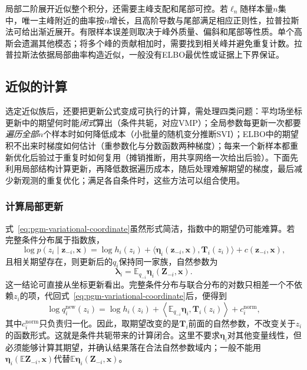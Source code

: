 局部二阶展开近似整个积分，还需要主峰支配和尾部可控。若$\ell_n$随样本量$n$集中，唯一主峰附近的曲率按$n$增长，且高阶导数与尾部满足相应正则性，拉普拉斯法可给出渐近展开。有限样本误差则取决于峰外质量、偏斜和尾部等性质。单个高斯会遗漏其他模态；将多个峰的贡献相加时，需要找到相关峰并避免重复计数。拉普拉斯法依据局部曲率构造近似，一般没有ELBO最优性或证据上下界保证。

\subsection{近似的计算}
\label{sec:pgm-variational-stochastic-amortized}
\label{sec:pgm-variational-complexity}

\label{sec:pgm-variational-scalable}
选定近似族后，还要把更新公式变成可执行的计算，需处理四类问题：平均场坐标更新中的期望何时能\emph{闭式}算出（条件共轭，对应VMP）；全局参数每更新一次都要\emph{遍历全部}$n$个样本时如何降低成本（小批量的随机变分推断SVI）；ELBO中的期望积不出来时梯度如何估计（重参数化与分数函数两种梯度）；每来一个新样本都重新优化后验过于重复时如何复用（摊销推断，用共享网络一次给出后验）。下面先利用局部结构计算更新，再降低数据遍历成本，随后处理难解期望的梯度，最后减少新观测的重复优化；满足各自条件时，这些方法可以组合使用。

\subsubsection{计算局部更新}

\label{sec:pgm-variational-coordinate-vmp}
\label{sec:pgm-variational-vmp}

式~\eqref{eq:pgm-variational-coordinate}虽然形式简洁，指数中的期望仍可能难算。若完整条件分布属于指数族，
\[
  \log p(z_i\mid\bm{z}_{-i},\bm{x})
    =\log h_i(z_i)
      +\langle\bm{\eta}_i(\bm{z}_{-i},\bm{x}),\bm T_i(z_i)\rangle
      +c(\bm{z}_{-i},\bm{x}),
\]
且相关期望存在，则更新后的$q_i$保持同一家族，自然参数为
\begin{equation}
  \bm{\lambda}_i
    =\mathbb E_{q_{-i}}\bm{\eta}_i(\bm{Z}_{-i},\bm{x}).
  \label{eq:pgm-variational-conjugacy}
\end{equation}
这一结论可直接从坐标更新看出。完整条件分布与联合分布的对数只相差一个不依赖$z_i$的项，代回式~\eqref{eq:pgm-variational-coordinate}后，便得到
\[
  \log q_i^{\mathrm{new}}(z_i)
    =\log h_i(z_i)
      +\left\langle\mathbb E_{q_{-i}}\bm\eta_i,
                       \bm T_i(z_i)\right\rangle+c_i^{\mathrm{norm}},
\]
其中$c_i^{\mathrm{norm}}$只负责归一化。因此，取期望改变的是$\bm T_i$前面的自然参数，不改变关于$z_i$的函数形式。这就是条件共轭带来的计算闭合。这里不要求$\bm{\eta}_i$对其他变量线性，但必须能够计算其期望，并确认结果落在合法自然参数域内；一般不能用$\bm\eta_i(\mathbb E\bm Z_{-i},\bm x)$代替$\mathbb E\bm\eta_i(\bm Z_{-i},\bm x)$。

